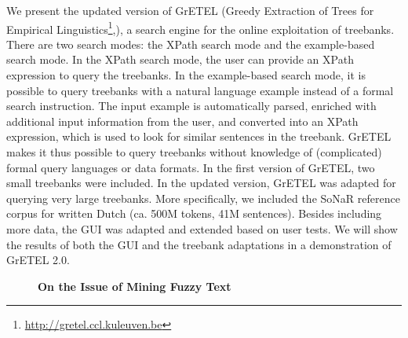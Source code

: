 \documentclass[10pt, a4paper, twopage, headinclude, footinclude, BCOR5mm]{book}
\begin{document}
\begin{table}[t!]
\end{table} 
\noindent
We present the updated version of GrETEL (Greedy Extraction of Trees for Empirical Linguistics\footnote{\url{ http://gretel.ccl.kuleuven.be}},), a search engine for the online exploitation of treebanks. There are two search modes: the XPath search mode and the example-based search mode. In the XPath search mode, the user can provide an XPath expression to query the treebanks. In the example-based search mode, it is possible to query treebanks with a natural language example instead of a formal search instruction. The input example is automatically parsed, enriched with additional input information from the user, and converted into an XPath expression, which is used to look for similar sentences in the treebank. GrETEL makes it thus possible to query treebanks without knowledge of (complicated) formal query languages or data formats.  In the first version of GrETEL, two small treebanks were included. In the updated version, GrETEL was adapted for querying very large treebanks. More specifically, we included the SoNaR reference corpus for written Dutch (ca. 500M tokens, 41M sentences).  Besides including more data, the GUI was adapted and extended based on user tests. We will show the results of both the GUI and the treebank adaptations in a demonstration of GrETEL 2.0.  

\newpage

\begin{figure}[t!]
\centering
\large\textbf{On the Issue of Mining Fuzzy Text}
\vspace*{0.5cm}
\end{figure}
\end{document}
